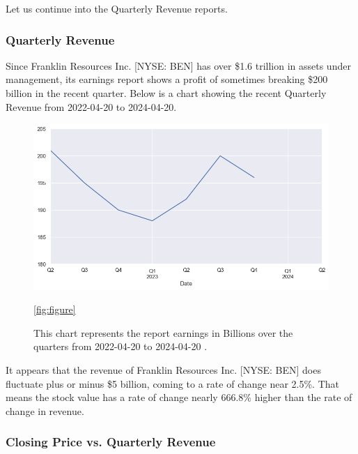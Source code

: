 \documentclass[9pt,a4paper,twoside]{tau}
\begin{document}
        Let us continue into the Quarterly Revenue reports.
            
    \subsubsection{Quarterly Revenue}
        
        Since Franklin Resources Inc. [NYSE: BEN] has over \$1.6 trillion in assets under management, its earnings report shows a profit of sometimes breaking \$200 billion in the recent quarter. Below is a chart showing the recent Quarterly Revenue from 2022-04-20 to 2024-04-20.
            \begin{figure}[H]
                \centering
                \includegraphics[width=0.85\columnwidth]{Figures/EarningByQt.png}
                \caption{This chart represents the report earnings in Billions over the quarters from 2022-04-20 to 2024-04-20 \cite{alpha-vantage-2024}.}
                \ref{fig:figure}
            \end{figure}
        
        It appears that the revenue of Franklin Resources Inc. [NYSE: BEN] does fluctuate plus or minus \$5 billion, coming to a rate of change near 2.5\%. That means the stock value has a rate of change nearly 666.8\% higher than the rate of change in revenue. 
            
    \subsubsection{Closing Price vs. Quarterly Revenue}   
        
\end{document}
